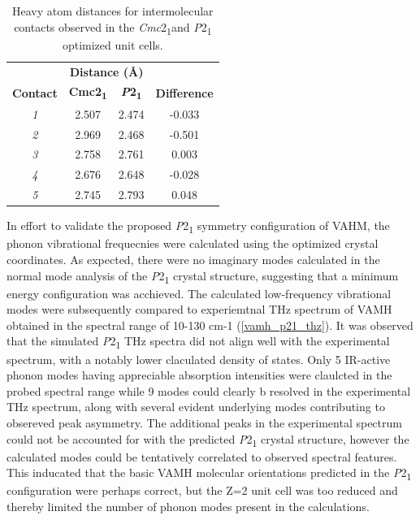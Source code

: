 \begin{table}[h]
    \centering
    \caption{Heavy atom distances for intermolecular contacts observed in the \textit{Cmc}2\textsubscript{1}and \textit{P}2\textsubscript{1} optimized unit cells.}
    \begin{tabular}{cccc}
    & \multicolumn{2}{c}{\textbf{Distance (Å)}} & \\
    \textbf{Contact} & \textbf{Cmc2\textsubscript{1}} & \textbf{\textit{P}2\textsubscript{1}} & \textbf{Difference} \\
    \hline
    \textit{1} & 2.507 & 2.474 & -0.033 \\
    \textit{2} & 2.969 & 2.468 & -0.501 \\
    \textit{3} & 2.758 & 2.761 & 0.003 \\
    \textit{4} & 2.676 & 2.648 & -0.028 \\
    \textit{5} & 2.745 & 2.793 & 0.048 \\
    \end{tabular}
    \label{tab:vamh_distances}
\end{table}

In effort to validate the proposed \textit{P}2\textsubscript{1} symmetry configuration of VAHM, the phonon vibrational frequecnies were calculated using the optimized crystal coordinates. As expected, there were no imaginary modes calculated in the normal mode analysis of the \textit{P}2\textsubscript{1} crystal structure, suggesting that a minimum energy configuration was acchieved. The calculated low-frequency vibrational modes were subsequently compared to experiemtnal THz spectrum of VAMH obtained in the spectral range of 10-130 cm-1 (\autoref{vamh_p21_thz}). It was observed that the simulated \textit{P}2\textsubscript{1} THz spectra did not align well with the experimental spectrum, with a notably lower claculated density of states. Only 5 IR-active phonon modes having appreciable absorption intensities were claulcted in the probed spectral range while 9 modes could clearly b resolved in the experimental THz spectrum, along with several evident underlying modes contributing to obsereved peak asymmetry. The additional peaks in the experimental spectrum could not be accounted for with the predicted \textit{P}2\textsubscript{1} crystal structure, however the calculated modes could be tentatively correlated to observed spectral features. This inducated that the basic VAMH molecular orientations predicted in the \textit{P}2\textsubscript{1} configuration were perhaps correct, but the Z=2 unit cell was too reduced and thereby limited the number of phonon modes present in the calculations. 

